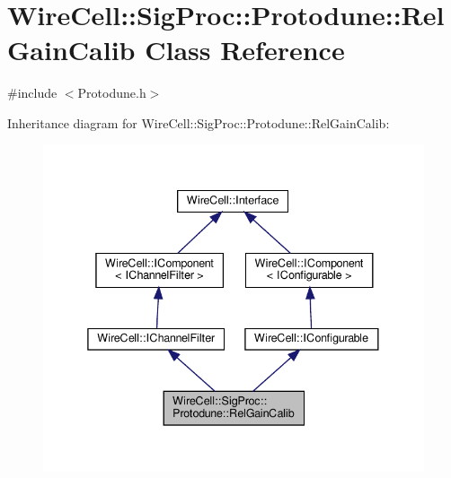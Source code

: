 \hypertarget{class_wire_cell_1_1_sig_proc_1_1_protodune_1_1_rel_gain_calib}{}\section{Wire\+Cell\+:\+:Sig\+Proc\+:\+:Protodune\+:\+:Rel\+Gain\+Calib Class Reference}
\label{class_wire_cell_1_1_sig_proc_1_1_protodune_1_1_rel_gain_calib}


{\ttfamily \#include $<$Protodune.\+h$>$}



Inheritance diagram for Wire\+Cell\+:\+:Sig\+Proc\+:\+:Protodune\+:\+:Rel\+Gain\+Calib\+:
\nopagebreak
\begin{figure}[H]
\begin{center}
\leavevmode
\includegraphics[width=338pt]{class_wire_cell_1_1_sig_proc_1_1_protodune_1_1_rel_gain_calib__inherit__graph}
\end{center}
\end{figure}


